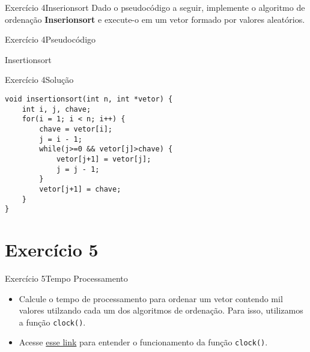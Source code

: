 \documentclass[aspectratio=169]{beamer}
\begin{document}
\begin{frame}[fragile]{Exercício 4}{Inserionsort}
Dado o pseudocódigo a seguir, implemente o algoritmo de ordenação {\bf Inserionsort} e execute-o em um vetor formado por valores aleatórios.
\end{frame}


\begin{frame}[fragile]{Exercício 4}{Pseudocódigo}
\begin{algorithm}[H]
\caption{Insertionsort} 
\label{Insertionsort}
\end{algorithm}
\end{frame}

\begin{frame}[fragile]{Exercício 4}{Solução}
\begin{lstlisting}[style=CStyle]
void insertionsort(int n, int *vetor) {
    int i, j, chave;
    for(i = 1; i < n; i++) {
        chave = vetor[i];
        j = i - 1;
        while(j>=0 && vetor[j]>chave) {
            vetor[j+1] = vetor[j];
            j = j - 1;
        }
        vetor[j+1] = chave;
    }
}
\end{lstlisting}
\end{frame}


\section{Exercício 5}

\begin{frame}[fragile]{Exercício 5}{Tempo Processamento}
\begin{itemize}
\item Calcule o tempo de processamento para ordenar um vetor contendo mil valores utilzando cada um dos algoritmos de ordenação. Para isso, utilizamos a função \verb|clock()|. 
\item Acesse \href{http://wurthmann.blogspot.com/2015/04/medir-tempo-de-execucao-em-c.html}{\color{blue} esse link} para entender o funcionamento da função \verb|clock()|.
\end{itemize}
\end{frame}
\end{document}
